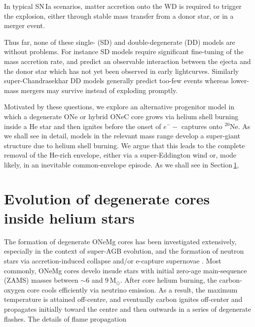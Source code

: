 \documentclass[twocolumn,tighten,times]{aastex62}
\begin{document}
 In  typical SN\,Ia scenarios, matter accretion onto the WD is required to trigger the explosion, either through stable mass transfer from a donor star,  or in a merger event.  
 
 
 
Thus far, none of these single- (SD) and double-degenerate (DD) models 
are without problems. For instance SD models require significant 
fine-tuning of the mass accretion rate, and predict an observable 
interaction between the ejecta and the donor star which has not yet 
been observed in early lightcurves. 
Similarly super-Chandrasekhar DD models generally 
predict too-few events whereas lower-mass mergers may survive instead of exploding promptly. 

Motivated by these questions, we explore an alternative progenitor model
in which a degenerate ONe or hybrid ONeC core grows via helium shell burning 
inside a He star and then ignites before the onset of $e^{-}-$ captures onto $^{20}$Ne. 
As we shall see in detail, models in the relevant mass range develop a 
super-giant structure due to helium shell burning. We argue that 
this leads to the complete removal of the He-rich envelope, 
either via a super-Eddington wind or, mode likely, in an inevitable common-envelope episode. 
As we shall see in Section\,\ref{sec:2}, 


\section{Evolution of degenerate cores inside helium stars}\label{sec:2}
The formation of degenerate ONeMg cores has been investigated extensively, 
especially in the context of super-AGB evolution, 
and the formation of neutron stars via accretion-induced collapse 
and/or e-capture supernovae \citep[][]{}.
Most commonly, ONeMg cores develo insude stars with initial zero-age 
main-sequence (ZAMS) masses between $\sim 6$ and 9\,M$_{\odot}$. 
After core helium burning, the carbon-oxygen core cools efficiently via neutrino emission. 
As a result, the maximum temperature is attained off-centre, and eventually 
carbon ignites off-center and propagates initially toward the centre and then outwards 
in a series of degenerate flashes. The details of flame propagation 
\end{document}
